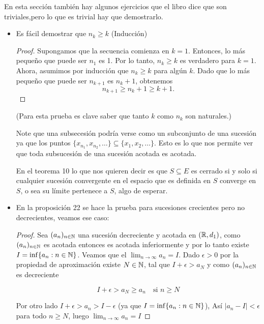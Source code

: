 En esta sección también hay algunos ejercicios que el libro dice que son triviales,pero lo que es trivial hay que demostrarlo.

\begin{itemize}[label={✎},leftmargin=*]

\item Es fácil demostrar que $n_k\geq k$ (Inducción)

\begin{proof}
Supongamos que la secuencia comienza en $k=1$. Entonces, lo más pequeño que puede ser $n_1$ es 1. Por lo tanto, $n_k \geq k$ es verdadero para $k=1$. Ahora, asumimos por inducción que $n_k \geq k$ para algún $k$. Dado que lo más pequeño que puede ser $n_{k+1}$ es $n_k+1$, obtenemos
$$
n_{k+1} \geq n_k+1 \geq k+1.
$$
\end{proof}

(Para esta prueba es clave saber que tanto $k$ como $n_k$ son naturales.)

\begin{note}
Note que una subsecesión podría verse como un subconjunto de una sucesión ya que los puntos $\{x_{n_1},x_{n_2},\ldots\}\subseteq\{x_1,x_2,\ldots\}$. Esto es lo que nos permite ver que toda subsucesión de una sucesión acotada es acotada.


\end{note}

\begin{note}
En el teorema 10 lo que nos quieren decir es que $S\subseteq E$ es cerrado si y solo si cualquier sucesión convergente en el espacio que es definida en $S$ converge en $S$, o sea su límite pertenece a $S$, algo de esperar.
\end{note}


\item En la proposición 22 se hace la prueba para sucesiones crecientes pero no decrecientes, veamos ese caso:\\

\begin{proof}
Sea $(a_n)_{n  \in \mathbb{N}}$ una sucesión decreciente y acotada en $(\mathbb{R},d_1)$, como $(a_n)_{n\in \mathbb{N}}$ es acotada entonces es acotada inferiormente y por lo tanto existe $I=\inf\{a_n: n\in \mathbb{N}\}$. Veamos que el $\lim_{n\to \infty}a_n=I$. Dado $\epsilon>0$ por la propiedad de aproximación existe $N\in \mathbb{N}$, tal que $I+\epsilon>a_N$ y como $(a_n)_{n\in \mathbb{N}}$ es decreciente

$$I+\epsilon>a_N\geq a_n\quad \text{si }n \geq N$$

Por otro lado $I+\epsilon>a_n>I-\epsilon$ (ya que $I=\inf\{a_n: n\in \mathbb{N}\}$), Así $|a_n-I|<\epsilon$ para todo $n\geq N$, luego $\lim_{n\to\infty}a_n=I$
\end{proof}


\end{itemize}
